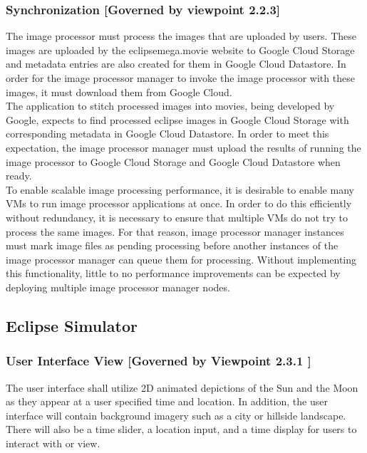\documentclass[10pt, onecolumn, draftclsnofoot, letterpaper, compsoc]{IEEEtran}
\begin{document}
    \subsubsection{Synchronization [Governed by viewpoint 2.2.3]}
    The image processor must process the images that are uploaded by users. These images are uploaded by the 
    eclipsemega.movie website to Google Cloud Storage and metadata entries are also created for them in Google 
    Cloud Datastore. In order for the image processor manager to invoke the image processor with these images, 
    it must download them from Google Cloud. \\

    The application to stitch processed images into movies, being developed by Google, expects to find 
    processed eclipse images in Google Cloud Storage with corresponding metadata in Google Cloud Datastore. In 
    order to meet this expectation, the image processor manager must upload the results of running the image 
    processor to Google Cloud Storage and Google Cloud Datastore when ready. \\

    To enable scalable image processing performance, it is desirable to enable many VMs to run image processor 
    applications at once. In order to do this efficiently without redundancy, it is necessary to ensure that 
    multiple VMs do not try to process the same images. For that reason, image processor manager instances must 
    mark image files as pending processing before another instances of the image processor manager can queue 
    them for processing. Without implementing this functionality, little to no performance improvements can be 
    expected by deploying multiple image processor manager nodes. \\

\subsection{Eclipse Simulator}

  \subsubsection{User Interface View [Governed by Viewpoint 2.3.1 ]}
  The user interface shall utilize 2D animated depictions of
  the Sun and the Moon as they appear at a user specified
  time and location. In addition, the user interface will
  contain background imagery such as a city or hillside
  landscape. There will also be a time slider, a location
  input, and a time display for users to interact with or
  view. \\
\end{document}
